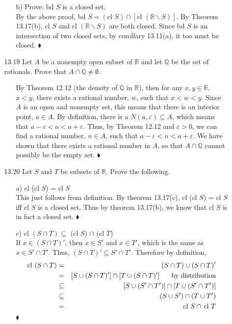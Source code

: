 \documentclass[12pt]{article}
\begin{document}
\begin{enumerate}
\begin{enumerate}
\begin{enumerate}
\item[b)] Prove: bd $S$ is a closed set. \\
By the above proof, bd $S = (\mbox{cl } S) \cap [\mbox{cl }(\mathbb{R}\backslash S)]$. 
By Theorem 13.17(b), $\mbox{cl } S$ and $\mbox{cl }(\mathbb{R}\backslash S)$ are both closed.
Since bd $S$ is an intersection of two closed sets, by corollary 13.11(a), it too must be closed.
$\blacklozenge$
\end{enumerate}

\item[13.19] Let $A$ be a nonempty open subset of $\mathbb{R}$ and let $\mathbb{Q}$ be the set of rationals. Prove that $A \cap \mathbb{Q} \neq \emptyset$.
\begin{enumerate}
\item[] By Theorem 12.12 (the density of $\mathbb{Q}$ in $\mathbb{R}$), then for any $x, y \in \mathbb{R}$, $x < y$, there exists a rational number, $w$, such that $x < w < y$. Since $A$ is an open and nonempty set, this means that there is an interior point, $a \in A$. By definition, there is a $N(a, \varepsilon) \subseteq A$, which means that $a - \varepsilon < a < a + \varepsilon$. Thus, by Theorem 12.12 and $\varepsilon > 0$, we can find a rational number, $n \in A$, such that $a - \varepsilon < n < a + \varepsilon$. We have shown that there exists a rational number in $A$, so that $A \cap \mathbb{Q}$ cannot possibly be the empty set. $\blacklozenge$
\end{enumerate}

\item[13.20] Let $S$ and $T$ be subsets of $\mathbb{R}$. Prove the following.
\begin{enumerate}
\item[a)] cl (cl $S$) = cl $S$ \\
This just follows from definition. By theorem 13.17(c), cl (cl $S$) = cl $S$ iff 
cl $S$ is a closed set. Thus by theorem 13.17(b), we know that cl $S$ is in fact a closed set.
$\blacklozenge$

\item[c)] cl $(S \cap T) \subseteq$ (cl $S$) $\cap$ (cl $T$) \\
If $x \in (S \cap T)'$, then $x \in S'$ and $x \in T'$, which is the same as $x \in S' \cap T'$.
Thus, $(S \cap T)' \subseteq S' \cap T'$. Therefore by definition, 
\begin{eqnarray*}
\mbox{cl } (S \cap T) &=& (S \cap T) \cup (S \cap T)' \\
&=& [S \cup (S \cap T)'] \cap [T \cup (S \cap T)'] \hskip .6cm \mbox{by distribution}\\
&\subseteq & [S \cup (S' \cap T')] \cap [T \cup (S' \cap T')] \\
&\subseteq & (S \cup S') \cap (T \cup T') \\
&=& \mbox{cl } S \cap\, \mbox{cl } T
\end{eqnarray*}
\hskip 14.0cm $\blacklozenge$


\end{enumerate}
\end{enumerate}
\end{enumerate}
\end{document}
